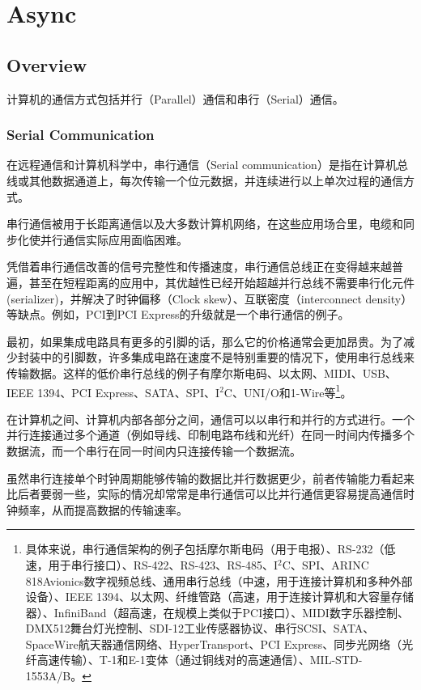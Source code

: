 \part{Async}


\chapter{Overview}


计算机的通信方式包括并行（Parallel）通信和串行（Serial）通信。


\section{Serial Communication}

在远程通信和计算机科学中，串行通信（Serial communication）是指在计算机总线或其他数据通道上，每次传输一个位元数据，并连续进行以上单次过程的通信方式。

串行通信被用于长距离通信以及大多数计算机网络，在这些应用场合里，电缆和同步化使并行通信实际应用面临困难。

凭借着串行通信改善的信号完整性和传播速度，串行通信总线正在变得越来越普遍，甚至在短程距离的应用中，其优越性已经开始超越并行总线不需要串行化元件(serializer)，并解决了时钟偏移（Clock skew）、互联密度（interconnect density）等缺点。例如，PCI到PCI Express的升级就是一个串行通信的例子。

最初，如果集成电路具有更多的引脚的话，那么它的价格通常会更加昂贵。为了减少封装中的引脚数，许多集成电路在速度不是特别重要的情况下，使用串行总线来传输数据。这样的低价串行总线的例子有摩尔斯电码、以太网、MIDI、USB、IEEE 1394、PCI Express、SATA、SPI、I$^2$C、UNI/O和1-Wire等\footnote{具体来说，串行通信架构的例子包括摩尔斯电码（用于电报）、RS-232（低速，用于串行接口）、RS-422、RS-423、RS-485、I$^2$C、SPI、ARINC 818Avionics数字视频总线、通用串行总线（中速，用于连接计算机和多种外部设备）、IEEE 1394、以太网、纤维管路（高速，用于连接计算机和大容量存储器）、InfiniBand（超高速，在规模上类似于PCI接口）、MIDI数字乐器控制、DMX512舞台灯光控制、SDI-12工业传感器协议、串行SCSI、SATA、SpaceWire航天器通信网络、HyperTransport、PCI Express、同步光网络（光纤高速传输）、T-1和E-1变体（通过铜线对的高速通信）、MIL-STD-1553A/B。}。

在计算机之间、计算机内部各部分之间，通信可以以串行和并行的方式进行。一个并行连接通过多个通道（例如导线、印制电路布线和光纤）在同一时间内传播多个数据流，而一个串行在同一时间内只连接传输一个数据流。

虽然串行连接单个时钟周期能够传输的数据比并行数据更少，前者传输能力看起来比后者要弱一些，实际的情况却常常是串行通信可以比并行通信更容易提高通信时钟频率，从而提高数据的传输速率。

